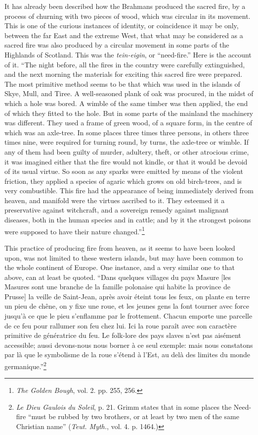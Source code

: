 \documentclass[a4paper, 11pt, oneside, polutonikogreek, english]{article}
\begin{document}
It has already been described how the Brahmans produced the sacred fire, by a process of churning with two pieces of wood, which was circular in its movement. This is one of the curious instances of identity, or coincidence it may be only, between the far East and the extreme West, that what may be considered as a sacred fire was also produced by a circular movement in some parts of the Highlands of Scotland. This was the \emph{tein-eigin}, or ``need-fire.'' Here is the account of it. ``The night before, all the fires in the country were carefully extinguished, and the next morning the materials for exciting this sacred fire were prepared. The most primitive method seems to be that which was used in the islands of Skye, Mull, and Tiree. A well-seasoned plank of oak was procured, in the midst of which a hole was bored. A wimble of the same timber was then applied, the end of which they fitted to the hole. But in some parts of the mainland the machinery was different. They used a frame of green wood, of a square form, in the centre of which was an axle-tree. In some places three times three persons, in others three times nine, were required for turning round, by turns, the axle-tree or wimble. If any of them had been guilty of murder, adultery, theft, or other atrocious crime, it was imagined either that the fire would not kindle, or that it would be devoid of its usual virtue. So soon as any sparks were emitted by means of the violent friction, they applied a species of agaric which grows on old birch-trees, and is very combustible. This fire had the appearance of being immediately derived from heaven, and manifold were the virtues ascribed to it. They esteemed it a preservative against witchcraft, and a sovereign remedy against malignant diseases, both in the human species and in cattle; and by it the strongest poisons were supposed to have their nature changed.''\footnote{\emph{The Golden Bough}, vol. 2. pp. 255, 256.}

This practice of producing fire from heaven, as it seems to have been looked upon, was not limited to these western islands, but may have been common to the whole continent of Europe. One instance, and a very similar one to that above, can at least be quoted. ``Dans quelques villages du pays Masure [les Masures sont une branche de la famille polonaise qui habite la province de Prusse] la veille de Saint-Jean, après avoir éteint tous les feux, on plante en terre un pieu de chêne, on y fixe une roue, et les jeunes gens la font tourner avec force jusqu'à ce que le pieu s'enflamme par le frottement. Chacun emporte une parcelle de ce feu pour rallumer son feu chez lui. Ici la roue paraît avec son caractère primitive de génératrice du feu. Le folk-lore des pays slaves n'est pas aisément accessible; aussi devons-nous nous borner à ce seul exemple: mais nous constatons par là que le symbolisme de la roue s'étend à l'Est, au delà des limites du monde germanique.''\footnote{\emph{Le Dieu Gaulois du Soleil}, p. 21. Grimm states that in some places the Need-fire ``must be rubbed by two brothers, or at least by two men of the same Christian name'' (\emph{Teut. Myth.}, vol. 4. p. 1464.)}
\end{document}
